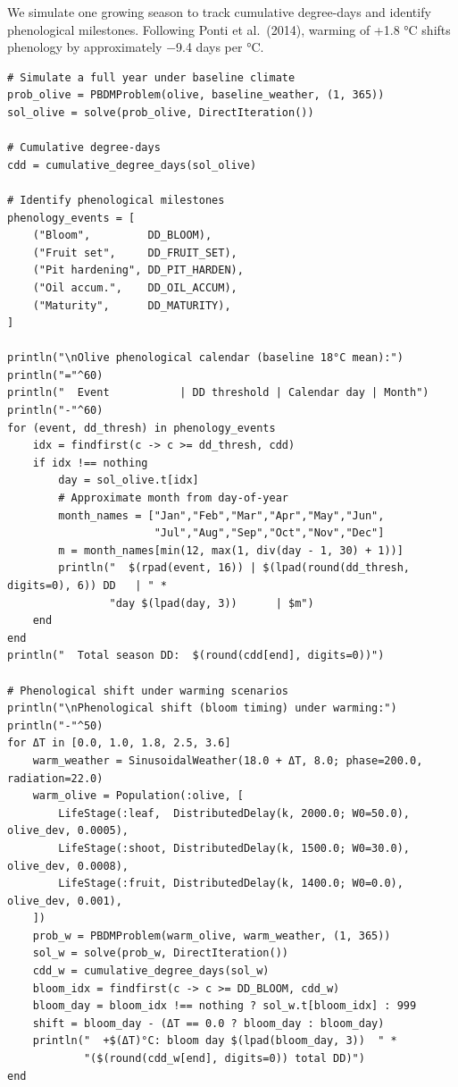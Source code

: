 We simulate one growing season to track cumulative degree-days and identify phenological milestones. Following Ponti et al.~(2014), warming of +1.8 °C shifts phenology by approximately −9.4 days per °C.




\begin{verbatim}
# Simulate a full year under baseline climate
prob_olive = PBDMProblem(olive, baseline_weather, (1, 365))
sol_olive = solve(prob_olive, DirectIteration())

# Cumulative degree-days
cdd = cumulative_degree_days(sol_olive)

# Identify phenological milestones
phenology_events = [
    ("Bloom",         DD_BLOOM),
    ("Fruit set",     DD_FRUIT_SET),
    ("Pit hardening", DD_PIT_HARDEN),
    ("Oil accum.",    DD_OIL_ACCUM),
    ("Maturity",      DD_MATURITY),
]

println("\nOlive phenological calendar (baseline 18°C mean):")
println("="^60)
println("  Event           | DD threshold | Calendar day | Month")
println("-"^60)
for (event, dd_thresh) in phenology_events
    idx = findfirst(c -> c >= dd_thresh, cdd)
    if idx !== nothing
        day = sol_olive.t[idx]
        # Approximate month from day-of-year
        month_names = ["Jan","Feb","Mar","Apr","May","Jun",
                       "Jul","Aug","Sep","Oct","Nov","Dec"]
        m = month_names[min(12, max(1, div(day - 1, 30) + 1))]
        println("  $(rpad(event, 16)) | $(lpad(round(dd_thresh, digits=0), 6)) DD   | " *
                "day $(lpad(day, 3))      | $m")
    end
end
println("  Total season DD:  $(round(cdd[end], digits=0))")

# Phenological shift under warming scenarios
println("\nPhenological shift (bloom timing) under warming:")
println("-"^50)
for ΔT in [0.0, 1.0, 1.8, 2.5, 3.6]
    warm_weather = SinusoidalWeather(18.0 + ΔT, 8.0; phase=200.0, radiation=22.0)
    warm_olive = Population(:olive, [
        LifeStage(:leaf,  DistributedDelay(k, 2000.0; W0=50.0), olive_dev, 0.0005),
        LifeStage(:shoot, DistributedDelay(k, 1500.0; W0=30.0), olive_dev, 0.0008),
        LifeStage(:fruit, DistributedDelay(k, 1400.0; W0=0.0),  olive_dev, 0.001),
    ])
    prob_w = PBDMProblem(warm_olive, warm_weather, (1, 365))
    sol_w = solve(prob_w, DirectIteration())
    cdd_w = cumulative_degree_days(sol_w)
    bloom_idx = findfirst(c -> c >= DD_BLOOM, cdd_w)
    bloom_day = bloom_idx !== nothing ? sol_w.t[bloom_idx] : 999
    shift = bloom_day - (ΔT == 0.0 ? bloom_day : bloom_day)
    println("  +$(ΔT)°C: bloom day $(lpad(bloom_day, 3))  " *
            "($(round(cdd_w[end], digits=0)) total DD)")
end
\end{verbatim}





